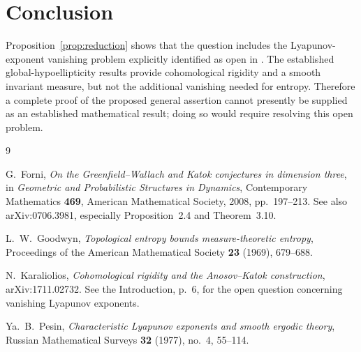 \documentclass[11pt]{article}
\theoremstyle{definition}
\theoremstyle{remark}
\begin{document}
\section{Conclusion}

Proposition~\ref{prop:reduction} shows that the question includes the
Lyapunov-exponent vanishing problem explicitly identified as open in
\cite{Karaliolios}. The established global-hypoellipticity results
provide cohomological rigidity and a smooth invariant measure, but
not the additional vanishing needed for entropy. Therefore a complete
proof of the proposed general assertion cannot presently be supplied
as an established mathematical result; doing so would require resolving
this open problem.

\begin{thebibliography}{9}

G.~Forni,
\emph{On the Greenfield--Wallach and Katok conjectures in dimension three},
in \emph{Geometric and Probabilistic Structures in Dynamics},
Contemporary Mathematics \textbf{469},
American Mathematical Society, 2008, pp.~197--213.
See also arXiv:0706.3981, especially Proposition~2.4 and Theorem~3.10.

L.~W.~Goodwyn,
\emph{Topological entropy bounds measure-theoretic entropy},
Proceedings of the American Mathematical Society
\textbf{23} (1969), 679--688.

N.~Karaliolios,
\emph{Cohomological rigidity and the Anosov--Katok construction},
arXiv:1711.02732.
See the Introduction, p.~6, for the open question concerning
vanishing Lyapunov exponents.

Ya.~B.~Pesin,
\emph{Characteristic Lyapunov exponents and smooth ergodic theory},
Russian Mathematical Surveys
\textbf{32} (1977), no.~4, 55--114.

\end{thebibliography}
\end{document}
